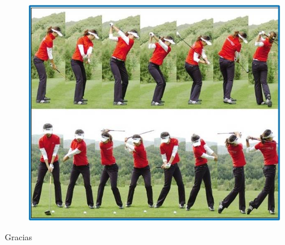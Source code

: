 \documentclass{beamer}
\begin{document}
\begin{frame}


\begin{figure}
\includegraphics[width=0.76\linewidth]{frames.jpg}
\end{figure}


\end{frame}
\begin{frame}


Gracias

\end{frame}
\end{document}
